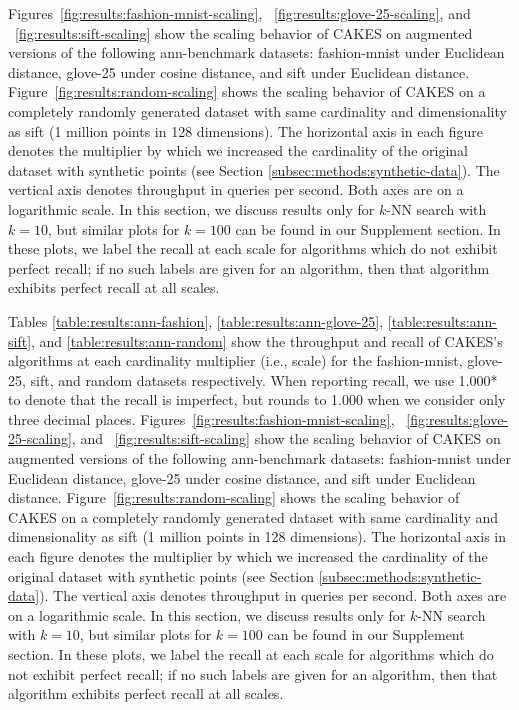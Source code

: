 Figures~\ref{fig:results:fashion-mnist-scaling}, ~\ref{fig:results:glove-25-scaling}, and ~\ref{fig:results:sift-scaling} show the scaling behavior of CAKES on augmented versions of the following ann-benchmark datasets: fashion-mnist under Euclidean distance, glove-25 under cosine distance, and sift under Euclidean distance. 
Figure~\ref{fig:results:random-scaling} shows the scaling behavior of CAKES on a completely randomly generated dataset with same cardinality and dimensionality as sift (1 million points in 128 dimensions).
The horizontal axis in each figure denotes the multiplier by which we increased the cardinality of the original dataset with synthetic points (see Section \ref{subsec:methods:synthetic-data}). 
The vertical axis denotes throughput in queries per second. Both axes are on a logarithmic scale. In this section, we discuss results only for $k$-NN search with $k = 10$, but similar plots for $k=100$ can be found in our Supplement section. In these plots, we label the recall at each scale for algorithms which do not exhibit perfect recall; if no such labels are given for an algorithm, then that algorithm exhibits perfect recall at all scales.

Tables \ref{table:results:ann-fashion}, \ref{table:results:ann-glove-25}, \ref{table:results:ann-sift}, and \ref{table:results:ann-random} show the throughput and recall of CAKES's algorithms at each cardinality multiplier (i.e., scale) for the fashion-mnist, glove-25, sift, and random datasets respectively. When reporting recall, we use 1.000* to denote that the recall is imperfect, but rounds to 1.000 when we consider
only three decimal places.
Figures~\ref{fig:results:fashion-mnist-scaling}, ~\ref{fig:results:glove-25-scaling}, and ~\ref{fig:results:sift-scaling} show the scaling behavior of CAKES on augmented versions of the following ann-benchmark datasets: fashion-mnist under Euclidean distance, glove-25 under cosine distance, and sift under Euclidean distance. 
Figure~\ref{fig:results:random-scaling} shows the scaling behavior of CAKES on a completely randomly generated dataset with same cardinality and dimensionality as sift (1 million points in 128 dimensions).
The horizontal axis in each figure denotes the multiplier by which we increased the cardinality of the original dataset with synthetic points (see Section \ref{subsec:methods:synthetic-data}). 
The vertical axis denotes throughput in queries per second. Both axes are on a logarithmic scale. In this section, we discuss results only for $k$-NN search with $k = 10$, but similar plots for $k=100$ can be found in our Supplement section. In these plots, we label the recall at each scale for algorithms which do not exhibit perfect recall; if no such labels are given for an algorithm, then that algorithm exhibits perfect recall at all scales.

